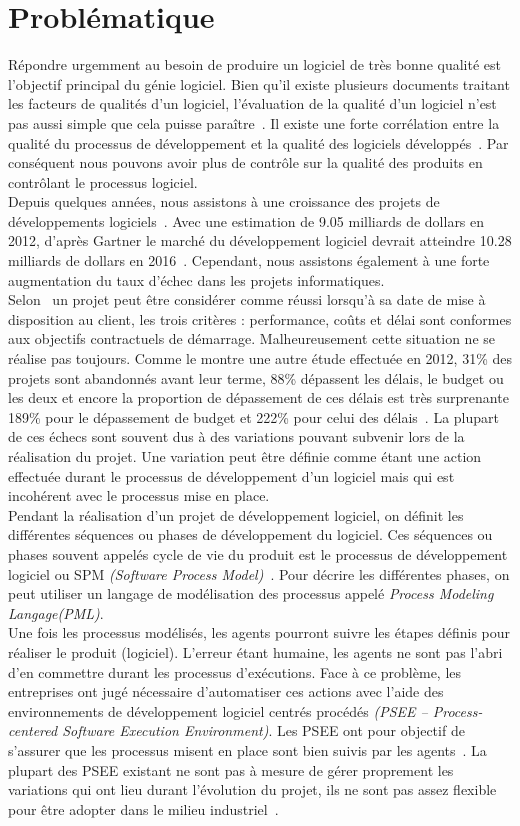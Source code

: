 \section{Problématique}
Répondre urgemment au besoin de produire un logiciel de très bonne qualité est l'objectif principal du génie logiciel. Bien qu'il existe plusieurs documents traitant les facteurs de qualités d'un logiciel, l'évaluation de la qualité d'un logiciel n'est pas aussi simple que cela puisse paraître~\citep{wikQual}. Il existe une forte corrélation entre la qualité du processus de développement et la qualité des logiciels développés~\cite{wikar}. Par conséquent nous pouvons avoir plus de contrôle sur la qualité des produits en contrôlant le processus logiciel.\\
Depuis quelques années, nous assistons à une croissance des projets de développements logiciels~\cite{jdn}. Avec une estimation de 9.05 milliards  de dollars en 2012, d'après Gartner le marché du développement logiciel devrait atteindre 10.28 milliards de dollars en 2016~\cite{01net}. Cependant, nous assistons également à une forte augmentation du taux d'échec dans  les projets informatiques.\\ 
Selon~\cite{gdpra} un projet peut être considérer comme réussi lorsqu'à sa date de mise à disposition au client, les trois critères : performance, coûts et délai sont conformes aux objectifs contractuels de démarrage. Malheureusement cette situation ne se réalise pas toujours. Comme le montre une autre étude effectuée en 2012, 31\% des projets sont abandonnés avant leur terme, 88\% dépassent les délais, le budget ou les deux et encore la proportion de dépassement de ces délais est très surprenante 189\% pour le dépassement de budget et 222\% pour celui des délais~\cite{pcp}. La plupart de ces échecs sont souvent dus à des variations pouvant subvenir lors de la réalisation du projet. Une variation peut être définie comme étant une  action effectuée durant le processus de développement d'un logiciel mais qui est incohérent avec le processus mise en place.\\
Pendant la réalisation d'un projet de développement logiciel, on définit les différentes séquences ou phases de développement du logiciel. Ces séquences ou phases souvent appelés cycle de vie du produit est le processus de développement logiciel ou SPM \textit{(Software Process Model)}~\cite{tse}. Pour décrire les différentes phases, on peut utiliser un langage de modélisation des processus appelé \textit{Process Modeling Langage(PML)}.\\
Une fois les processus modélisés, les agents pourront suivre les étapes définis pour réaliser le produit (logiciel). L'erreur étant humaine, les agents ne sont pas l'abri d'en commettre durant les processus d'exécutions. Face à ce problème, les entreprises ont jugé nécessaire d'automatiser ces actions avec l'aide des environnements de développement logiciel centrés procédés \textit{(PSEE – Process-centered Software Execution Environment)}. Les PSEE ont pour objectif de s'assurer que les processus misent en place sont bien suivis par les agents~\cite{alm1}. La plupart des PSEE existant ne sont pas à mesure de gérer proprement les variations qui ont lieu durant l'évolution du projet, ils ne sont pas assez flexible pour être adopter dans le milieu industriel~\cite{kabaaj20}.
